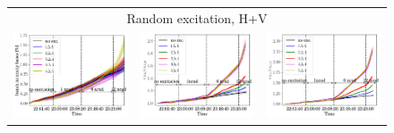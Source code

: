 \documentclass[aps
,prstab
,reprint
,longbibliography
,preprintnumbers
,showkeys
,amsfonts,amssymb,amsmath
,floatfix
]{revtex4-1}
\newlength{\thirdwidth}
\begin{document}
\begin{figure}
\begin{tabular}{ccc}
    \multicolumn{3}{c}{Random excitation, H+V} \\
    \includegraphics[width=\thirdwidth]{2017_bunch_intensity_hvran_no_damper_avg.png} &
    \includegraphics[width=\thirdwidth]{2017_emith_avg_rel_hvran_no_damper.png} &
    \includegraphics[width=\thirdwidth]{2017_emitv_avg_rel_hvran_no_damper.png}\\

\end{tabular}
\end{figure}
\end{document}
